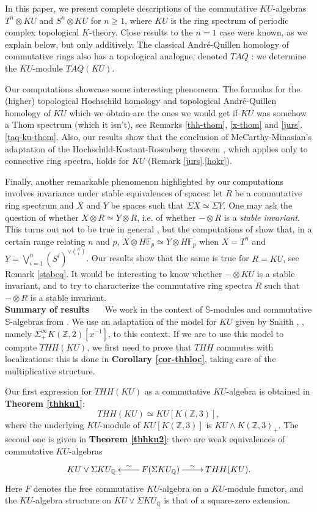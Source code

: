 \documentclass[a4paper,11pt]{amsart} %
\theoremstyle{definition} \newtheorem{defn}[equation]{Definition}
\theoremstyle{remark} \newtheorem{notation}[equation]{Notation}
\theoremstyle{plain} \newtheorem{teo}[equation]{Theorem}
\theoremstyle{plain} \newtheorem{lema}[equation]{Lemma}
\theoremstyle{plain} \newtheorem{prop}[equation]{Proposition}
\theoremstyle{plain} \newtheorem{corolario}[equation]{Corollary}
\theoremstyle{remark} \newtheorem{obs}[equation]{Remark}
\theoremstyle{remark} \newtheorem{sideobs}[equation]{Side remark}
\theoremstyle{remark} \newtheorem{ejercicio}[equation]{Exercise}
\theoremstyle{definition} \newtheorem{notn}[equation]{Notation}
\theoremstyle{remark} \newtheorem{ej}[equation]{Example}
\theoremstyle{remark} \newtheorem{contraej}[equation]{Counterexample}
\theoremstyle{plain} \newtheorem{conj}[equation]{Conjecture}
\newcommand{\paragrafo}[1]{\textbf{#1}\ \ \ }
\newcommand{\F}{\mathbb{F}}
\renewcommand{\1}{\ensuremath{\mathbbm{1}}}
\newcommand{\Q}{\mathbb{Q}}
\renewcommand{\S}{\mathbb{S}}
\newcommand{\Z}{\mathbb{Z}}
\newcommand{\sip}{\Sigma^\infty_+}
\numberwithin{equation}{section}
\begin{document}
In this paper, we present complete descriptions of the commutative $KU$-algebras $T^n\otimes KU$ and $S^n\otimes KU$ for $n\geq 1$, where $KU$ is the ring spectrum of periodic complex topological $K$-theory. Close results to the $n=1$ case were known, as we explain below, but only additively. The classical André-Quillen homology of commutative rings also has a topological analogue, denoted $TAQ$ \cite{basterra}: we determine the $KU$-module $TAQ(KU)$.

Our computations showcase some interesting phenomena. The formulas for the (higher) topological Hochschild homology and topological André-Quillen homology of $KU$ which we obtain are the ones we would get if $KU$ was somehow a Thom spectrum (which it isn't), 
%
see Remarks \ref{thh-thom}, \ref{x-thom} and \ref{jurs}.\ref{taq-ku-thom}. Also, our results show that the conclusion of McCarthy-Minasian's adaptation of the Hochschild-Kostant-Rosenberg theorem \cite{mccarthy-minasian}, which applies only to connective ring spectra, holds for $KU$ (Remark \ref{jurs}.\ref{hokr}).

Finally, another remarkable phenomenon highlighted by our computations involves invariance under stable equivalences of spaces: let $R$ be a commutative ring spectrum and $X$ and $Y$ be spaces such that $\Sigma X \simeq \Sigma Y$. One may ask the question of whether $X\otimes R\simeq Y\otimes R$, i.e. of whether $-\otimes R$ is a \emph{stable invariant}. This turns out not to be true in general \cite{dundas-tenti}, but the computations of \cite{veen} show that, in a certain range relating $n$ and $p$, $X\otimes H\F_p \simeq Y\otimes H\F_p$ when $X=T^n$ and $Y=\bigvee\limits_{i=1}^n (S^i)^{\vee {n \choose i}}$. Our results show that the same is true for $R=KU$, see Remark \ref{stabeq}. It would be interesting to know whether $-\otimes KU$ is a stable invariant, and to try to characterize the commutative ring spectra $R$ such that $-\otimes R$ is a stable invariant.\\

\paragrafo{Summary of results} We work in the context of $\S$-modules and commutative $\S$-algebras from \cite{ekmm}. We use an adaptation of the model for $KU$ given by Snaith \cite{snaith79}, \cite{snaith81}, namely $\sip K(\Z,2)[x^{-1}]$, to this context. If we are to use this model to compute $THH(KU)$, we first need to prove that $THH$ commutes with localizations: this is done in \textbf{Corollary \ref{cor-thhloc}}, taking care of the multiplicative structure.

Our first expression for $THH(KU)$ as a commutative $KU$-algebra is obtained in \textbf{Theorem \ref{thhku1}}:
\[THH(KU)\simeq KU[K(\Z,3)],\]
where the underlying $KU$-module of $KU[K(\Z,3)]$ is $KU \wedge K(\Z,3)_+$. The second one is given in \textbf{Theorem \ref{thhku2}}: there are weak equivalences of commutative $KU$-algebras
\[\xymatrix{ KU \vee \Sigma KU_\Q  & \ar[l]_-\sim F(\Sigma KU_\Q) \ar[r]^-\sim & THH(KU).}\]
Here $F$ denotes the free commutative $KU$-algebra on a $KU$-module functor, and the $KU$-algebra structure on $KU\vee \Sigma KU_\Q$ is that of a square-zero extension. 
\end{document}

